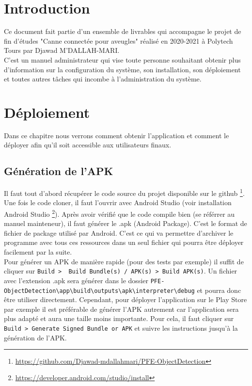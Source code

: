\documentclass[UTF8]{EPURapport}
\begin{document}
\chapter{Introduction}

Ce document fait partie d'un ensemble de livrables qui accompagne le projet de fin d'études "Canne connectée pour aveugles" réalisé en 2020-2021 à Polytech Tours par Djawad M'DALLAH-MARI.\\

C'est un manuel administrateur qui vise toute personne souhaitant obtenir plus d'information sur la configuration du système, son installation, son déploiement et toutes autres tâches qui incombe à l'administration du système.

\chapter{Déploiement}
Dans ce chapitre nous verrons comment obtenir l'application et comment le déployer afin qu'il soit accessible aux utilisateurs finaux.

\section{Génération de l'APK}

Il faut tout d'abord récupérer le code source du projet disponible sur le github \footnote{\url{https://github.com/Djawad-mdallahmari/PFE-ObjectDetection}}. Une fois le code cloner, il faut l'ouvrir avec Android Studio (voir installation Android Studio \footnote{\url{https://developer.android.com/studio/install}}). Après avoir vérifié que le code compile bien (se référrer au manuel mainteneur), il faut générer le .apk (Android Package). C'est le format de fichier de package utilisé par Android. C'est ce qui va permettre d'archiver le programme avec tous ces ressources dans un seul fichier qui pourra être déployer facilement par la suite.\\
Pour générer un APK de manière rapide (pour des tests par exemple) il suffit de cliquer sur \verb|Build >  Build Bundle(s) / APK(s) > Build APK(s)|. Un fichier avec l'extension .apk sera générer dans le dossier \verb|PFE-ObjectDetection\app\build\outputs\apk\interpreter\debug| et pourra donc être utiliser directement. Cependant, pour déployer l'application sur le Play Store par exemple il est préférable de générer l'APK autrement car l'application sera plus adapté et aura une taille moins importante. Pour cela, il faut cliquer sur \verb|Build > Generate Signed Bundle or APK| et suivre les instructions jusqu'à la génération de l'APK.
\end{document}
